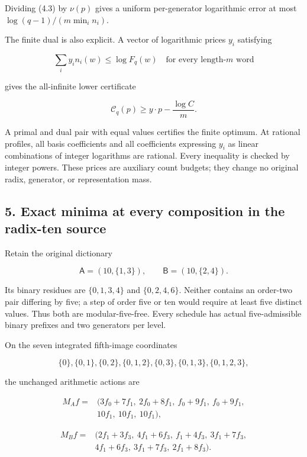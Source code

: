 Dividing (4.3) by \(\nu(p)\) gives a uniform per-generator logarithmic error at most \(\log(q-1)/(m\min_i n_i)\).

The finite dual is also explicit. A vector of logarithmic prices \(y_i\) satisfying

\[
\sum_i y_i n_i(w)\le\log F_q(w)
\quad\text{for every length-}m\text{ word}
\tag{4.4}
\]

gives the all-infinite lower certificate

\[
\mathcal C_q(p)\ge y\cdot p-\frac{\log C}{m}.
\tag{4.5}
\]

A primal and dual pair with equal values certifies the finite optimum. At rational profiles, all basis coefficients and all coefficients expressing \(y_i\) as linear combinations of integer logarithms are rational. Every inequality is checked by integer powers. These prices are auxiliary count budgets; they change no original radix, generator, or representation mass.

\subsection{5. Exact minima at every composition in the radix-ten source}\label{eporig:exact-minima-at-every-composition-in-the-radix-ten-source}

Retain the original dictionary

\[
\mathsf A=(10,\{1,3\}),\qquad
\mathsf B=(10,\{2,4\}).
\tag{5.1}
\]

Its binary residues are \(\{0,1,3,4\}\) and \(\{0,2,4,6\}\). Neither contains an order-two pair differing by five; a step of order five or ten would require at least five distinct values. Thus both are modular-five-free. Every schedule has actual five-admissible binary prefixes and two generators per level.

On the seven integrated fifth-image coordinates

\[
\{0\},\{0,1\},\{0,2\},\{0,1,2\},
\{0,3\},\{0,1,3\},\{0,1,2,3\},
\]

the unchanged arithmetic actions are

\[
\begin{split}
M_Af={}&(3f_0+7f_1,\ 2f_0+8f_1,\ f_0+9f_1,\ f_0+9f_1,\\
&10f_1,\ 10f_1,\ 10f_1),
\end{split}
\]

\[
\begin{split}
M_Bf={}&(2f_1+3f_3,\ 4f_1+6f_3,\ f_1+4f_3,\ 3f_1+7f_3,\\
&4f_1+6f_3,\ 3f_1+7f_3,\ 2f_1+8f_3).
\end{split}
\tag{5.2}
\]

